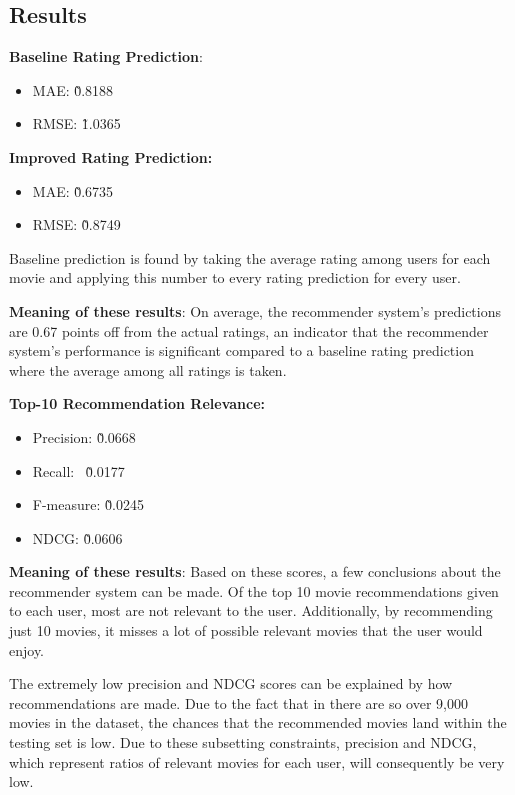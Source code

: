 \documentclass[nonacm, sigconf]{acmart}
\begin{document}
\subsection{Results}

\textbf{Baseline Rating Prediction}:
\begin{itemize}
    \item MAE: \~0.8188
    \item RMSE: \~1.0365
\end{itemize}

\textbf{Improved Rating Prediction:}
\begin{itemize}
    \item MAE: \~0.6735
    \item RMSE: \~0.8749
\end{itemize}

Baseline prediction is found by taking the average rating among users for each movie and applying this number to every rating prediction for every user.

\textbf{Meaning of these results}:
On average, the recommender system's predictions are 0.67 points off from the actual ratings, an indicator that the recommender system's performance is significant compared to a baseline rating prediction where the average among all ratings is taken.

\textbf{Top-10 Recommendation Relevance:}
\begin{itemize}
    \item Precision: \~0.0668
    \item Recall: ~\~0.0177
    \item F-measure: \~0.0245
    \item NDCG: \~0.0606
\end{itemize}

\textbf{Meaning of these results}:
Based on these scores, a few conclusions about the recommender system can be made. Of the top 10 movie recommendations given to each user, most are not relevant to the user. Additionally, by recommending just 10 movies, it misses a lot of possible relevant movies that the user would enjoy. 

The extremely low precision and NDCG scores can be explained by how recommendations are made. Due to the fact that in there are so over 9,000 movies in the dataset, the chances that the recommended movies land within the testing set is low. Due to these subsetting constraints, precision and NDCG, which represent ratios of relevant movies for each user, will consequently be very low.
\end{document}
